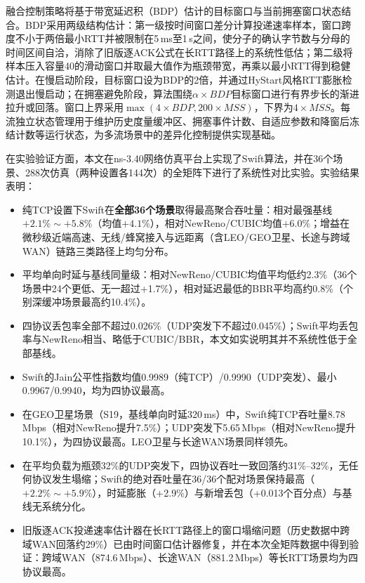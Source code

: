 融合控制策略将基于带宽延迟积（BDP）估计的目标窗口与当前拥塞窗口状态结合。BDP采用两级结构估计：第一级按时间窗口差分计算投递速率样本，窗口跨度不小于两倍最小RTT并被限制在5\,ms至1\,s之间，使分子的确认字节数与分母的时间区间自洽，消除了旧版逐ACK公式在长RTT路径上的系统性低估；第二级将样本压入容量40的滑动窗口并取最大值作为瓶颈带宽，再乘以最小RTT得到稳健估计。在慢启动阶段，目标窗口设为BDP的2倍，并通过HyStart风格RTT膨胀检测退出慢启动；在拥塞避免阶段，算法围绕$\alpha \times BDP$目标窗口进行有界步长的渐进拉升或回落。窗口上界采用$\max(4 \times BDP, 200 \times MSS)$，下界为$4 \times MSS$。每流独立状态管理用于维护历史度量缓冲区、拥塞事件计数、自适应参数和降窗后冻结计数等运行状态，为多流场景中的差异化控制提供实现基础。

在实验验证方面，本文在ns-3.40网络仿真平台上实现了Swift算法，并在36个场景、288次仿真（两种设置各144次）的全矩阵下进行了系统性对比实验。实验结果表明：

\begin{itemize}
    \item 纯TCP设置下Swift在\textbf{全部36个场景}取得最高聚合吞吐量：相对最强基线$+2.1\%\sim+5.8\%$（均值$+4.1\%$），相对NewReno/CUBIC均值$+6.0\%$；增益在微秒级近端高速、无线/蜂窝接入与远距离（含LEO/GEO卫星、长途与跨域WAN）链路三类路径上均匀分布。
    \item 平均单向时延与基线同量级：相对NewReno/CUBIC均值平均低约2.3\%（36个场景中24个更低、无一超过+1.7\%），相对延迟最低的BBR平均高约0.8\%（个别深缓冲场景最高约10.4\%）。
    \item 四协议丢包率全部不超过0.026\%（UDP突发下不超过0.045\%）；Swift平均丢包率与NewReno相当、略低于CUBIC/BBR，本文如实说明其并不系统性低于全部基线。
    \item Swift的Jain公平性指数均值0.9989（纯TCP）/0.9990（UDP突发）、最小0.9967/0.9940，均为四协议最高。
    \item 在GEO卫星场景（S19，基线单向时延320\,ms）中，Swift纯TCP吞吐量8.78\,Mbps（相对NewReno提升7.5\%）；UDP突发下5.65\,Mbps（相对NewReno提升10.1\%），为四协议最高。LEO卫星与长途WAN场景同样领先。
    \item 在平均负载为瓶颈32\%的UDP突发下，四协议吞吐一致回落约31\%--32\%，无任何协议发生塌缩；Swift的绝对吞吐量在36/36个配对场景保持最高（$+2.2\%\sim+5.9\%$），时延膨胀（+2.9\%）与新增丢包（+0.013个百分点）与基线无系统分化。
    \item 旧版逐ACK投递速率估计器在长RTT路径上的窗口塌缩问题（历史数据中跨域WAN回落约29\%）已由时间窗口估计器修复，并在本次全矩阵数据中得到验证：跨域WAN（874.6\,Mbps）、长途WAN（881.2\,Mbps）等长RTT场景均为四协议最高。
\end{itemize}

